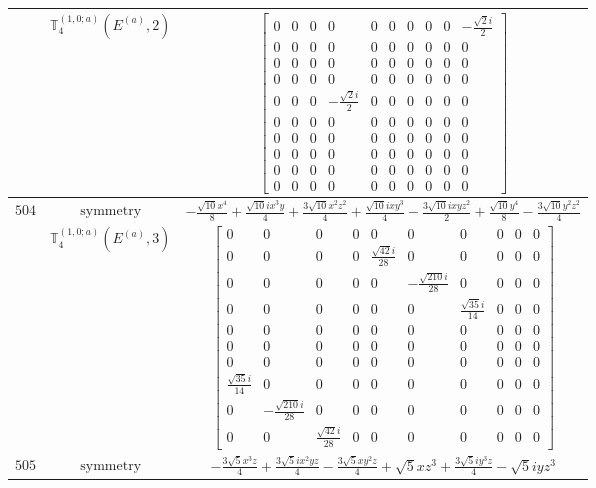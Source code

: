 \documentclass[fleqn,8pt,landscape]{jsarticle}
\begin{document}
\begin{longtable}{ccc}
$  $ & $ \mathbb{T}_{4}^{(1,0;a)}(E^{(a)},2) $ & $ \begin{bmatrix} 0 & 0 & 0 & 0 & 0 & 0 & 0 & 0 & 0 & - \frac{\sqrt{2} i}{2} \\ 0 & 0 & 0 & 0 & 0 & 0 & 0 & 0 & 0 & 0 \\ 0 & 0 & 0 & 0 & 0 & 0 & 0 & 0 & 0 & 0 \\ 0 & 0 & 0 & 0 & 0 & 0 & 0 & 0 & 0 & 0 \\ 0 & 0 & 0 & - \frac{\sqrt{2} i}{2} & 0 & 0 & 0 & 0 & 0 & 0 \\ 0 & 0 & 0 & 0 & 0 & 0 & 0 & 0 & 0 & 0 \\ 0 & 0 & 0 & 0 & 0 & 0 & 0 & 0 & 0 & 0 \\ 0 & 0 & 0 & 0 & 0 & 0 & 0 & 0 & 0 & 0 \\ 0 & 0 & 0 & 0 & 0 & 0 & 0 & 0 & 0 & 0 \\ 0 & 0 & 0 & 0 & 0 & 0 & 0 & 0 & 0 & 0 \end{bmatrix} $ \\ \hline
$ 504 $ & $ \text{symmetry} $ & $ - \frac{\sqrt{10} x^{4}}{8} + \frac{\sqrt{10} i x^{3} y}{4} + \frac{3 \sqrt{10} x^{2} z^{2}}{4} + \frac{\sqrt{10} i x y^{3}}{4} - \frac{3 \sqrt{10} i x y z^{2}}{2} + \frac{\sqrt{10} y^{4}}{8} - \frac{3 \sqrt{10} y^{2} z^{2}}{4} $ \\
$  $ & $ \mathbb{T}_{4}^{(1,0;a)}(E^{(a)},3) $ & $ \begin{bmatrix} 0 & 0 & 0 & 0 & 0 & 0 & 0 & 0 & 0 & 0 \\ 0 & 0 & 0 & 0 & \frac{\sqrt{42} i}{28} & 0 & 0 & 0 & 0 & 0 \\ 0 & 0 & 0 & 0 & 0 & - \frac{\sqrt{210} i}{28} & 0 & 0 & 0 & 0 \\ 0 & 0 & 0 & 0 & 0 & 0 & \frac{\sqrt{35} i}{14} & 0 & 0 & 0 \\ 0 & 0 & 0 & 0 & 0 & 0 & 0 & 0 & 0 & 0 \\ 0 & 0 & 0 & 0 & 0 & 0 & 0 & 0 & 0 & 0 \\ 0 & 0 & 0 & 0 & 0 & 0 & 0 & 0 & 0 & 0 \\ \frac{\sqrt{35} i}{14} & 0 & 0 & 0 & 0 & 0 & 0 & 0 & 0 & 0 \\ 0 & - \frac{\sqrt{210} i}{28} & 0 & 0 & 0 & 0 & 0 & 0 & 0 & 0 \\ 0 & 0 & \frac{\sqrt{42} i}{28} & 0 & 0 & 0 & 0 & 0 & 0 & 0 \end{bmatrix} $ \\ \hline
$ 505 $ & $ \text{symmetry} $ & $ - \frac{3 \sqrt{5} x^{3} z}{4} + \frac{3 \sqrt{5} i x^{2} y z}{4} - \frac{3 \sqrt{5} x y^{2} z}{4} + \sqrt{5} x z^{3} + \frac{3 \sqrt{5} i y^{3} z}{4} - \sqrt{5} i y z^{3} $ \\

\end{longtable}
\end{document}
